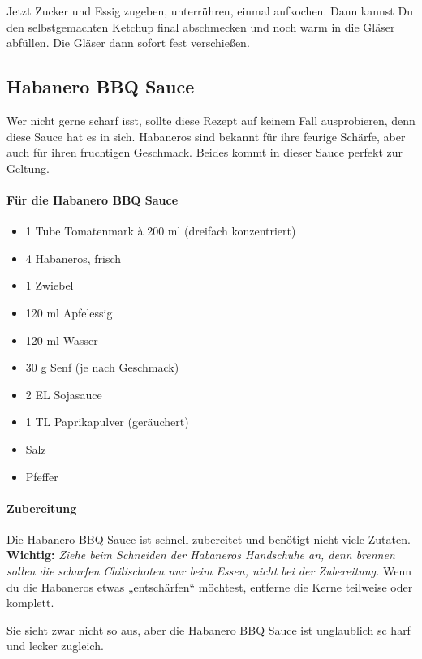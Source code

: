 Jetzt Zucker und Essig zugeben, unterrühren, einmal aufkochen. Dann kannst 
Du den selbstgemachten 
Ketchup final abschmecken und noch warm in die Gläser abfüllen. Die Gläser 
dann sofort fest verschießen.

\subsection{Habanero BBQ Sauce}
Wer nicht gerne scharf isst, sollte diese Rezept auf keinem Fall ausprobieren, 
denn diese Sauce hat es in sich. Habaneros sind bekannt für ihre feurige 
Schärfe, aber auch für ihren fruchtigen Geschmack. Beides kommt in dieser 
Sauce perfekt zur Geltung.
\newline

\paragraph{Für die Habanero BBQ Sauce}

\begin{itemize}[noitemsep]
	\item 1 Tube Tomatenmark à 200 ml (dreifach konzentriert)
	\item 4 Habaneros, frisch
	\item 1 Zwiebel
	\item 120 ml Apfelessig
	\item 120 ml Wasser
	\item 30 g Senf (je nach Geschmack)
	\item 2 EL Sojasauce
	\item 1 TL Paprikapulver (geräuchert)
	\item Salz
	\item Pfeffer
\end{itemize}

\paragraph{Zubereitung}

Die Habanero BBQ Sauce ist schnell zubereitet und benötigt nicht viele Zutaten.
\textbf{Wichtig:} \emph{Ziehe beim Schneiden der Habaneros Handschuhe an, 
	denn brennen sollen die 
	scharfen Chilischoten nur beim Essen, nicht bei der Zubereitung.} Wenn du 
	die Habaneros etwas 
„entschärfen“ möchtest, entferne die Kerne teilweise oder komplett.

Sie sieht zwar nicht so aus, aber die Habanero BBQ Sauce ist unglaublich sc
harf und lecker zugleich.


